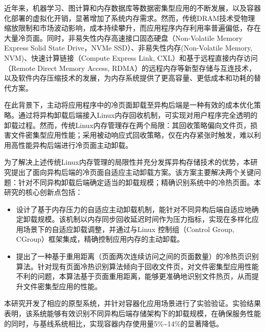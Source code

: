 
\begin{chineseabstract}

近年来，机器学习、图计算和内存数据库等数据密集型应用的不断发展，以及容器化部署的虚拟化开销，显著增加了系统内存需求。然而，传统DRAM技术受物理缩放限制和市场波动影响，成本持续攀升，而应用程序内存利用率普遍偏低，存在大量冷页面。同时，非易失性内存高速接口固态硬盘（Non-Volatile Memory Express Solid State Drive，NVMe SSD）、非易失性内存(Non-Volatile Memory, NVM)、快速计算链接（Compute Express Link, CXL）和基于远程直接内存访问（Remote Direct Memory Access, RDMA）的远程内存等新型存储与互连技术，以及软件内存压缩技术的发展，为内存系统提供了更高容量、更低成本和功耗的替代方案。

在此背景下，主动将应用程序中的冷页面卸载至异构后端是一种有效的成本优化策略。通过将异构卸载后端接入Linux内存回收机制，可实现对用户程序完全透明的卸载过程。然而，传统Linux内存管理存在两个局限：其回收策略偏向文件页，损害文件密集型应用性能；采用被动响应式回收策略，仅在内存紧张时触发，难以利用高性能异构后端进行冷页面主动卸载。

为了解决上述传统Linux内存管理的局限性并充分发挥异构存储技术的优势，本研究提出了面向异构后端的冷页面自适应主动卸载方案。该方案主要解决两个关键问题：针对不同异构卸载后端确定适当的卸载规模；精确识别系统中的冷热页面。本研究的核心创新点包括：
\begin{itemize}
    \item 设计了基于内存压力的自适应主动卸载机制，能针对不同异构后端自适应地确定卸载规模。该机制以内存同步回收延迟时间作为压力指标，实现在多样化应用场景下的自适应卸载调整，并通过与Linux 控制组（Control Group, CGroup）框架集成，精确控制应用内存的主动卸载。
    \item 提出了一种基于重用距离（页面两次连续访问之间的页面数量）的冷热页识别算法。针对现有页面冷热识别算法倾向于回收文件页，对文件密集型应用性能不利的问题，本算法基于页面重用距离，能够更准确地识别文件热页，从而提升文件密集型应用的性能。
\end{itemize}

本研究开发了相应的原型系统，并针对容器化应用场景进行了实验验证。实验结果表明，该系统能够有效识别不同异构后端存储架构下的卸载规模，在确保服务性能的同时，与基线系统相比，实现容器内存使用量5\%\~{}14\%的显著降低。

\end{chineseabstract}